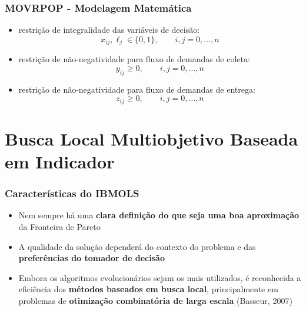 \documentclass{beamer}
\begin{document}
\begin{frame}
 \frametitle{MOVRPOP - Modelagem Matemática}
 \begin{itemize}
 \item restrição de integralidade das variáveis de decisão:
\begin{equation}
\label{eq:modelagem_8}
x_{ij}, \ell_j \in \{0, 1\}, \qquad i, j = 0,\ldots,n
\end{equation}

\item restrição de não-negatividade para fluxo de demandas de coleta:
\begin{equation}
\label{eq:modelagem_9}
y_{ij} \geq 0, \qquad i, j = 0,\ldots,n
\end{equation}

\item restrição de não-negatividade para fluxo de demandas de entrega:
\begin{equation}
\label{eq:modelagem_10}
z_{ij} \geq 0, \qquad i, j = 0,\ldots,n
\end{equation}
  \end{itemize}

\end{frame}

\section{Busca Local Multiobjetivo Baseada em Indicador}
\begin{frame}
 \frametitle{Características do IBMOLS}
 \begin{itemize}
  \item Nem sempre há uma \textbf{clara definição do que seja uma boa aproximação} da Fronteira de Pareto    
  \item A qualidade da solução dependerá do contexto do problema e das \textbf{preferências do tomador de decisão} 
  \item Embora os algoritmos evolucionários sejam os mais utilizados, é reconhecida a eficiência dos \textbf{métodos 
  baseados em busca local}, principalmente em problemas de \textbf{otimização combinatória de larga escala} (Basseur, 2007)
  
 \end{itemize}
  
\end{frame}
\end{document}
